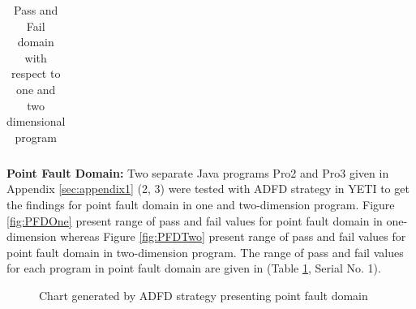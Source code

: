 \documentclass[runningheads,a4paper]{llncs}
\begin{document}
\begin{table}[h]
\begin{tabular}{|c|c|c|l|l|l|}
				
\end{tabular}
\bigskip
\caption{Pass and Fail domain with respect to one and two dimensional program}
\label{tab:failtable}
\end{table}




\noindent \textbf{Point Fault Domain:}  Two separate Java programs Pro2 and Pro3 given in Appendix \ref{sec:appendix1} (2, 3) were tested with ADFD strategy in YETI to get the findings for point fault domain in one and two-dimension program. Figure \ref{fig:PFDOne} present range of pass and fail values for point fault domain in one-dimension whereas Figure \ref{fig:PFDTwo} present range of pass and fail values for point fault domain in two-dimension program. The range of pass and fail values for each program in point fault domain are given in (Table \ref{tab:failtable}, Serial No. 1).

\begin{figure} [H]



\caption{Chart generated by ADFD strategy presenting point fault domain}
\end{figure}

\end{document}
